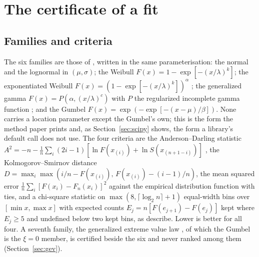 \documentclass[preprint,11pt,authoryear]{elsarticle}
\begin{document}
\section{The certificate of a fit}\label{sec:method}

\subsection{Families and criteria}
The six families are those of \citet[\S2.1]{reis2026}, written in the same parameterisation: the normal and the lognormal in $(\mu, \sigma)$; the Weibull $F(x) = 1 - \exp[-(x/\lambda)^k]$; the exponentiated Weibull $F(x) = (1 - \exp[-(x/\lambda)^k])^\alpha$ \citep{mudholkar1993}; the generalized gamma $F(x) = P(\alpha, (x/\lambda)^c)$ with $P$ the regularized incomplete gamma function \citep{stacy1962}; and the Gumbel $F(x) = \exp(-\exp[-(x-\mu)/\beta])$. None carries a location parameter except the Gumbel's own; this is the form the method paper prints and, as Section~\ref{sec:scipy} shows, the form a library's default call does not use. The four criteria are the Anderson--Darling statistic $A^2 = -n - \frac{1}{n}\sum_i (2i-1)[\ln F(x_{(i)}) + \ln S(x_{(n+1-i)})]$ \citep{anderson1954}, the Kolmogorov--Smirnov distance $D = \max_i \max(i/n - F(x_{(i)}),\, F(x_{(i)}) - (i-1)/n)$, the mean squared error $\frac{1}{n}\sum_i [F(x_i) - F_n(x_i)]^2$ against the empirical distribution function with ties, and a chi-square statistic on $\max(8, \lceil \log_2 n \rceil + 1)$ equal-width bins over $[\min x, \max x]$ with expected counts $E_j = n[F(e_{j+1}) - F(e_j)]$ kept where $E_j \ge 5$ and undefined below two kept bins, as \citet[\S2.2]{reis2026} describe. Lower is better for all four. A seventh family, the generalized extreme value law \citep{jenkinson1955}, of which the Gumbel is the $\xi = 0$ member, is certified beside the six and never ranked among them (Section~\ref{sec:gev}).
\end{document}

